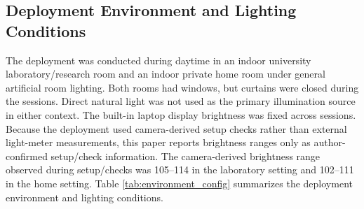 \documentclass[dvipdfmx]{ehis}
\begin{document}
\subsection{Deployment Environment and Lighting Conditions}
The deployment was conducted during daytime in an indoor university laboratory/research room and an indoor private home room under general artificial room lighting.
Both rooms had windows, but curtains were closed during the sessions.
Direct natural light was not used as the primary illumination source in either context.
The built-in laptop display brightness was fixed across sessions.
Because the deployment used camera-derived setup checks rather than external light-meter measurements, this paper reports brightness ranges only as author-confirmed setup/check information.
The camera-derived brightness range observed during setup/checks was 105--114 in the laboratory setting and 102--111 in the home setting.
Table \ref{tab:environment_config} summarizes the deployment environment and lighting conditions.
\end{document}
